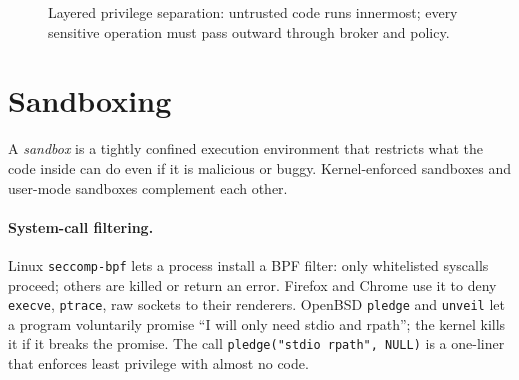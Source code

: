 \begin{figure}[h]
\centering
{}
\caption{Layered privilege separation: untrusted code runs innermost; every sensitive operation must pass outward through broker and policy.}
\label{fig:priv-layers}
\end{figure}
\section{Sandboxing}
\label{sec:sandbox}
A \emph{sandbox} is a tightly confined execution environment that restricts what the code inside can do even if it is malicious or buggy. Kernel-enforced sandboxes and user-mode sandboxes complement each other.
\paragraph{System-call filtering.} Linux \texttt{seccomp-bpf} lets a process install a BPF filter: only whitelisted syscalls proceed; others are killed or return an error. Firefox and Chrome use it to deny \texttt{execve}, \texttt{ptrace}, raw sockets to their renderers. OpenBSD \texttt{pledge} and \texttt{unveil} let a program voluntarily promise ``I will only need stdio and rpath''; the kernel kills it if it breaks the promise. The call \texttt{pledge("stdio rpath", NULL)} is a one-liner that enforces least privilege with almost no code.
